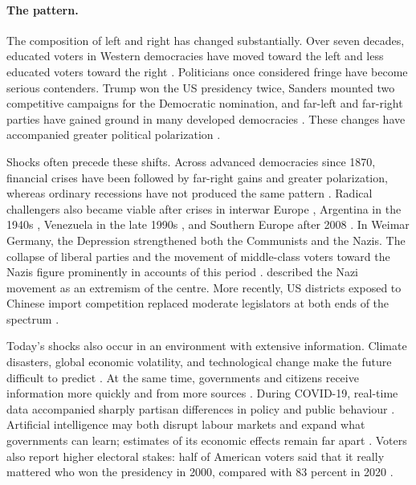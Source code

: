 \documentclass[12pt,letterpaper]{article}
\begin{document}
\paragraph{The pattern.}
The composition of left and right has changed substantially. Over seven decades, educated voters in Western democracies have moved toward the left and less educated voters toward the right \citep{Gethin2022}. Politicians once considered fringe have become serious contenders. Trump won the US presidency twice, Sanders mounted two competitive campaigns for the Democratic nomination, and far-left and far-right parties have gained ground in many developed democracies \citep{Rooduijn2024}. These changes have accompanied greater political polarization \citep{Iyengar2019,McCarty2016}.

Shocks often precede these shifts. Across advanced democracies since 1870, financial crises have been followed by far-right gains and greater polarization, whereas ordinary recessions have not produced the same pattern \citep{Funke2016,Mian2014}. Radical challengers also became viable after crises in interwar Europe \citep{deBromhead2013}, Argentina in the 1940s \citep{Rock1987}, Venezuela in the late 1990s \citep{Weyland2003,Seawright2012}, and Southern Europe after 2008 \citep{Hernandez2016}. In Weimar Germany, the Depression strengthened both the Communists and the Nazis. The collapse of liberal parties and the movement of middle-class voters toward the Nazis figure prominently in accounts of this period \citep{Hamilton1982,Falter1991,King2008}. \citet{Lipset1960} described the Nazi movement as an extremism of the centre. More recently, US districts exposed to Chinese import competition replaced moderate legislators at both ends of the spectrum \citep{Autor2020}.

Today's shocks also occur in an environment with extensive information. Climate disasters, global economic volatility, and technological change make the future difficult to predict \citep{UNDP2022,Ahir2022}. At the same time, governments and citizens receive information more quickly and from more sources \citep{Zhuravskaya2020}. During COVID-19, real-time data accompanied sharply partisan differences in policy and public behaviour \citep{Adolph2022,Allcott2020}. Artificial intelligence may both disrupt labour markets and expand what governments can learn; estimates of its economic effects remain far apart \citep{Eloundou2024,Acemoglu2025,Engstrom2020}. Voters also report higher electoral stakes: half of American voters said that it really mattered who won the presidency in 2000, compared with 83 percent in 2020 \citep{Pew2020}.
\end{document}
